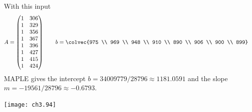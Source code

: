\begin{ans}{8}
      \begin{exparts}
        \partsitem With this input
          \begin{equation*}
            A =
            \begin{pmatrix}
              1 & 306 \\
              1 & 329 \\
              1 & 356 \\
              1 & 367 \\
              1 & 396 \\
              1 & 427 \\
              1 & 415 \\
              1 & 424
            \end{pmatrix}
            \qquad
            b =
            \colvec{975 \\
                    969 \\
                    948 \\
                    910 \\
                    890 \\
                    906 \\
                    900 \\
                    899}
          \end{equation*}
          MAPLE gives the intercept
          $b=34009779/28796\approx 1181.0591$ and the slope
          $m=-19561/28796\approx -0.6793$.
          \begin{center}  \small
            \texttt{[image: ch3.94]}
       \end{center}
      \end{exparts}
    
\end{ans}
